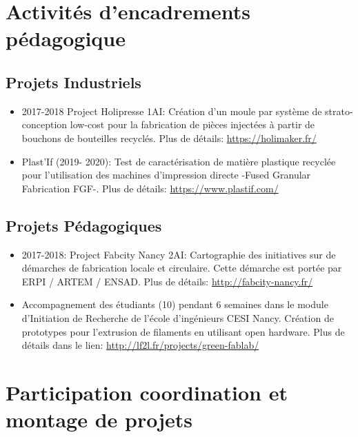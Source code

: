 \documentclass[
  12pt,
  oneside]{book}
\begin{document}
\hypertarget{activituxe9s-dencadrements-puxe9dagogique}{%
\section{Activités d'encadrements pédagogique}\label{activituxe9s-dencadrements-puxe9dagogique}}

\hypertarget{projets-industriels}{%
\subsection{Projets Industriels}\label{projets-industriels}}

\begin{itemize}
\item
  2017-2018 Project Holipresse 1AI: Création d'un moule par système de strato-conception low-cost pour la fabrication de pièces injectées à partir de bouchons de bouteilles recyclés.
  Plus de détails: \url{https://holimaker.fr/}
\item
  Plast'If (2019- 2020): Test de caractérisation de matière plastique recyclée pour l'utilisation des machines d'impression directe -Fused Granular Fabrication FGF-.
  Plus de détails: \url{https://www.plastif.com/}
\end{itemize}

\hypertarget{projets-puxe9dagogiques}{%
\subsection{Projets Pédagogiques}\label{projets-puxe9dagogiques}}

\begin{itemize}
\item
  2017-2018: Project Fabcity Nancy 2AI: Cartographie des initiatives sur de démarches de fabrication locale et circulaire. Cette démarche est portée par ERPI / ARTEM / ENSAD. Plus de détails: \url{http://fabcity-nancy.fr/}
\item
  Accompagnement des étudiants (10) pendant 6 semaines dans le module d'Initiation de Recherche de l'école d'ingénieurs CESI Nancy.
  Création de prototypes pour l'extrusion de filaments en utilisant open hardware.
  Plus de détails dans le lien: \url{http://lf2l.fr/projects/green-fablab/}
\end{itemize}

\hypertarget{participation-coordination-et-montage-de-projets}{%
\section{Participation coordination et montage de projets}\label{participation-coordination-et-montage-de-projets}}
\end{document}
